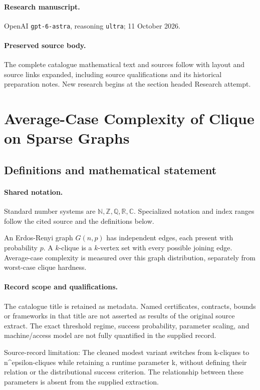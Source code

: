 \documentclass[11pt]{article}
\begin{document}
\paragraph{Research manuscript.} OpenAI \texttt{gpt-6-astra}, reasoning \texttt{ultra}; 11 October 2026.
\paragraph{Preserved source body.} The complete catalogue mathematical text and sources follow with layout and source links expanded, including source qualifications and its historical preparation notes. New research begins at the section headed Research attempt.

\section{Average-Case Complexity of Clique on Sparse Graphs}\label{statement}

\subsection{Definitions and mathematical statement}

\paragraph{Shared notation.}Standard number systems are $\mathbb N,\mathbb Z,\mathbb Q,\mathbb R,\mathbb C$. Specialized notation and index ranges follow the cited source and the definitions below.


An Erdos-Renyi graph $G(n,p)$ has independent edges, each present with probability $p$. A $k$-clique is a $k$-vertex set with every possible joining edge. Average-case complexity is measured over this graph distribution, separately from worst-case clique hardness.
\paragraph{Record scope and qualifications.}
The catalogue title is retained as metadata. Named certificates, contracts, bounds or frameworks in that title are not asserted as results of the original source extract.
The exact threshold regime, success probability, parameter scaling, and machine/access model are not fully quantified in the supplied record.

Source-record limitation: The cleaned modest variant switches from k-cliques to n^epsilon-cliques while retaining a runtime parameter k, without defining their relation or the distributional success criterion. The relationship between these parameters is absent from the supplied extraction.
\end{document}
